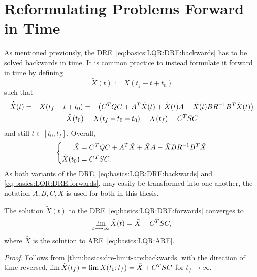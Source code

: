 \section{Reformulating Problems Forward in Time}
\label{sec:basics:tdir}

As mentioned previously, the \ac{DRE}~\eqref{eq:basics:LQR:DRE:backwards} has to be solved backwards in time.
It is common practice to instead formulate it forward in time by defining
\begin{equation}
  \tilde X(t) := X(t_f - t + t_0)
\end{equation}
such that
\begin{equation}
\begin{gathered}
  \dot{\tilde X}(t)
  = - \dot X(t_f - t + t_0)
  = + \big( C^T Q C + A^T \tilde X(t) + \tilde X(t) A - \tilde X(t) B R^{-1} B^T \tilde X(t) \big)
  \\
  \tilde X(t_0)
  = X(t_f - t_0 + t_0)
  = X(t_f)
  = C^T S C
\end{gathered}
\end{equation}
and still $t \in [t_0, t_f]$.
Overall,
\begin{equation}
\label{eq:basics:LQR:DRE:forwards}
\left\{
\begin{aligned}
  \dot{\tilde X} &= C^T Q C + A^T \tilde X + \tilde X A - \tilde X B R^{-1} B^T \tilde X \\
  \tilde X(t_0) &= C^T S C
  .
\end{aligned}
\right.
\end{equation}
As both variants of the \ac{DRE},
\eqref{eq:basics:LQR:DRE:backwards} and
\eqref{eq:basics:LQR:DRE:forwards},
may easily be transformed into one another,
the notation $A, B, C, X$ is used for both in this thesis.

\begin{corollary}
\label{thm:basics:dre-limit-are}
  The solution $\tilde X(t)$ to the \ac{DRE}~\eqref{eq:basics:LQR:DRE:forwards}
  converges to
  \begin{equation}
    \lim_{t\longrightarrow\infty} \tilde X(t) = \bar X + C^T S C
    ,
  \end{equation}
  where $\bar X$ is the solution to \ac{ARE}~\eqref{eq:basics:LQR:ARE}.
\end{corollary}
\begin{proof}
  Follows from \autoref{thm:basics:dre-limit-are:backwards} with the direction of time reversed,
  $\lim \tilde X(t_f) = \lim X(t_0; t_f) = \bar X + C^T S C$ for $t_f\to\infty$.
\end{proof}

